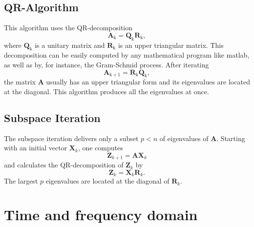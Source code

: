 \documentclass[conference]{journal}
\newcommand{\bb}[1]{\mathbb{#1}}
\newcommand{\B}[1]{\mathbf{#1}}
\newcommand{\Bx}{\B{x}}
\newcommand{\M}{\bb{M}}
\newcommand{\C}{\bb{C}}
\newcommand{\K}{\bb{K}}
\begin{document}
	\subsection*{QR-Algorithm}
	This algorithm uses the QR-decomposition
	\begin{equation}
	\textbf{A}_\mathrm{k}={\textbf{Q}_\mathrm{k}}{\textbf{R}_\mathrm{k}},
	\end{equation}
	where $\textbf{Q}_\mathrm{k}$ is a unitary matrix and $\textbf{R}_\mathrm{k}$ is an upper triangular matrix.
	This decomposition can be easily computed by any mathematical program like matlab, as well as by, for instance, the Gram-Schmid process. After iterating
	\begin{equation}
	\textbf{A}_\mathrm{k+1}={\textbf{R}_\mathrm{k}}{\textbf{Q}_\mathrm{k}},
	\end{equation}
	the matrix $\textbf{A}$ usually has an upper triangular form and its eigenvalues are located at the diagonal. This algorithm produces all the eigenvalues at once.
	 
	\subsection*{Subspace Iteration}
	The subspace iteration delivers only a subset $p<n$ of eigenvalues of $\textbf{A}$. Starting with an initial vector $\textbf{X}_k$, one computes
	\begin{equation}
	\textbf{Z}_{k+1}=\textbf{AX}_k
	\end{equation}
	and calculates the QR-decomposition of $\textbf{Z}_k$ by
	\begin{equation}
	\textbf{Z}_k=\textbf{X}_k\textbf{R}_k.
	\end{equation}
	The largest $p$ eigenvalues are located at the diagonal of $\textbf{R}_k$.
	
	
	
	\section{Time and frequency domain}\label{ch:timeFreq}
\end{document}
